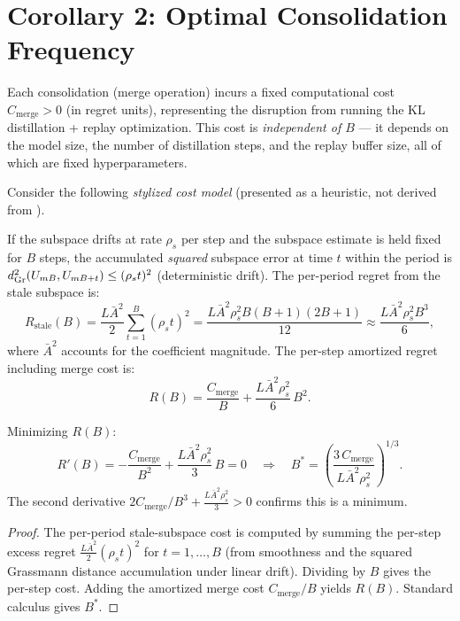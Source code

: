 \section{Corollary 2: Optimal Consolidation Frequency}
\label{sec:cor2}

\begin{definition}
\label{def:consolidation-cost}
Each consolidation (merge operation) incurs a fixed computational cost
$C_{\mathrm{merge}} > 0$ (in regret units), representing the disruption
from running the KL distillation + replay optimization. This cost is
\emph{independent of $B$} --- it depends on the model size, the number
of distillation steps, and the replay buffer size, all of which are fixed
hyperparameters.
\end{definition}

\begin{proposition}
\label{prop:optimal-B}
Consider the following \emph{stylized cost model} (presented as a
heuristic, not derived from ).

If the subspace drifts at rate $\rho_s$ per step and the subspace
estimate is held fixed for $B$ steps, the accumulated
\emph{squared} subspace error at time $t$ within the period is
$d_{\mathrm{Gr}}^2(U_{mB}, U_{mB+t}) \leq (\rho_s t)^2$ (deterministic drift).
The per-period regret from the stale subspace is:
\[
  R_{\mathrm{stale}}(B)
  = \frac{L\bar{A}^2}{2}\sum_{t=1}^B (\rho_s t)^2
  = \frac{L\bar{A}^2 \rho_s^2 B(B+1)(2B+1)}{12}
  \approx \frac{L\bar{A}^2 \rho_s^2 B^3}{6},
\]
where $\bar{A}^2$ accounts for the coefficient magnitude.
The per-step amortized regret including merge cost is:
\[
  R(B) = \frac{C_{\mathrm{merge}}}{B}
  + \frac{L\bar{A}^2 \rho_s^2}{6}\, B^2.
\]

Minimizing $R(B)$:
\[
  R'(B) = -\frac{C_{\mathrm{merge}}}{B^2}
  + \frac{L\bar{A}^2\rho_s^2}{3}\, B = 0
  \quad\Longrightarrow\quad
  B^* = \left(\frac{3\, C_{\mathrm{merge}}}{L\bar{A}^2\rho_s^2}
  \right)^{\!1/3}.
\]
The second derivative $2C_{\mathrm{merge}}/B^3 +
\frac{L\bar{A}^2\rho_s^2}{3} > 0$ confirms this is a minimum.
\end{proposition}

\begin{proof}
The per-period stale-subspace cost is computed by summing the
per-step excess regret $\frac{L\bar{A}^2}{2}(\rho_s t)^2$ for
$t = 1, \ldots, B$ (from smoothness and the squared Grassmann
distance accumulation under linear drift). Dividing by $B$ gives
the per-step cost. Adding the amortized merge cost $C_{\mathrm{merge}}/B$
yields $R(B)$. Standard calculus gives $B^*$.
\end{proof}

